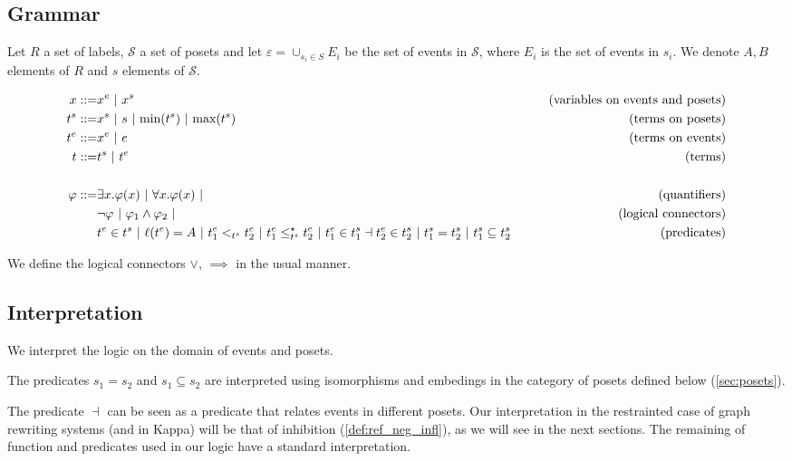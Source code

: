 \subsection{Grammar}

Let $R$ a set of labels, $\mathcal{S}$ a set of posets and let $\varepsilon = \cup_{s_i\in S} E_i$ be the set of events in $\mathcal{S}$, where $E_i$ is the set of events in $s_i$.
We denote $A,B$ elements of $R$ and $s$ elements of $\mathcal{S}$.

\begin{align*}
  x ::= & x^e ~|~ x^s & \tag{variables on events and posets} \\
  t^s ::= & x^s ~|~ s ~|~ \text{min}(t^s) ~|~ \text{max}(t^s) &\tag{terms on posets} \\
  t^e ::= & x^e ~|~ e & \tag{terms on events}\\
  t ::= & t^s ~|~ t^e & \tag{terms}\\
  \\
  \varphi ::= & \exists x.\varphi(x) ~|~ \forall x.\varphi(x) ~|&\tag{quantifiers}\\
  & \neg \varphi ~|~\varphi_1 \wedge \varphi_2~|&\tag{logical connectors}\\
  & t^e\in t^s ~|~ \ell(t^e) = A ~|~ t^e_1 <_{t^s} t^e_2 ~|~ t^e_1 \leq^{\star}_{t^s} t^e_2 ~|~ t^e_1\in t^s_1 \dashv t^e_2\in t^s_2~|~ t^s_1 = t^s_2 ~|~ t^s_1\subseteq t^s_2
  & \tag{predicates}\\
\end{align*}

We define the logical connectors $\vee$, $\implies$ in the usual manner.

\subsection{Interpretation}

We interpret the logic on the domain of events and posets.


The predicates $s_1 = s_2$ and $s_1\subseteq s_2$ are interpreted using isomorphisms and embedings in the category of posets defined below (\autoref{sec:posets}).

The predicate $\dashv$ can be seen as a predicate that relates events in different posets. Our interpretation in the restrainted case of graph rewriting systems (and in Kappa) will be that of inhibition (\autoref{def:ref_neg_infl}), as we will see in the next sections. The remaining of function and predicates used in our logic have a standard interpretation.


